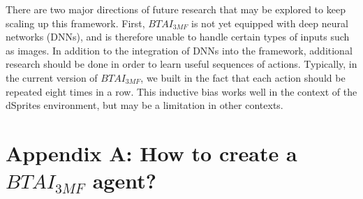 \documentclass[twoside,11pt]{article}
\begin{document}
There are two major directions of future research that may be explored to keep scaling up this framework. First, $BTAI_{3MF}$ is not yet equipped with deep neural networks (DNNs), and is therefore unable to handle certain types of inputs such as images. In addition to the integration of DNNs into the framework, additional research should be done in order to learn useful sequences of actions. Typically, in the current version of $BTAI_{3MF}$, we built in the fact that each action should be repeated eight times in a row. This inductive bias works well in the context of the dSprites environment, but may be a limitation in other contexts.


\vskip 0.2in


\section*{Appendix A: How to create a $BTAI_{3MF}$ agent?}
\end{document}

